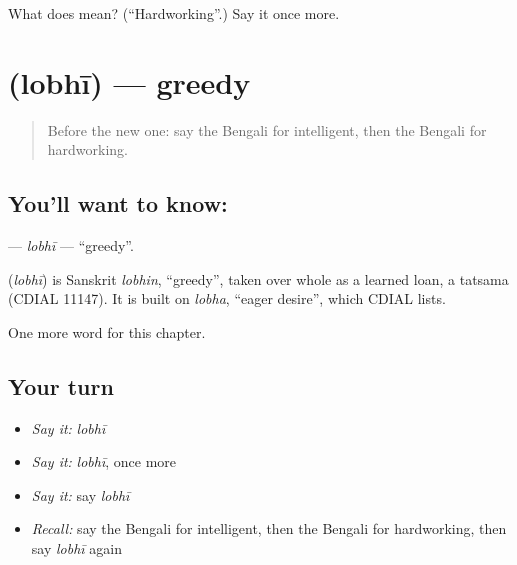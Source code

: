 \begin{tcolorbox}[breakable,colback=teal!4,colframe=teal!35!black,title={Before you move on}]
What does  mean? (\textquotedblleft{}Hardworking\textquotedblright{}.) Say it once more.
\end{tcolorbox}
\section[\texorpdfstring{\bn{লোভী} (lobhī)}{লোভী (lobhī)}]{ (lobhī) — greedy}

\label{lesson:BN-C160-lobhi}



\begin{quote}
Before the new one: say the Bengali for intelligent, then the Bengali for hardworking.
\end{quote}

\subsection*{You'll want to know: }
\textbf{} — \emph{lobhī} — \textquotedblleft{}greedy\textquotedblright{}.

\begin{cousinweb}
\textbf{} (\emph{lobhī}) is Sanskrit \emph{lobhin}, \textquotedblleft{}greedy\textquotedblright{}, taken over whole as a learned loan, a tatsama (CDIAL 11147). It is built on \emph{lobha}, \textquotedblleft{}eager desire\textquotedblright{}, which CDIAL lists.
\end{cousinweb}

\begin{grammarlens}[title={What you've built}]
One more word for this chapter.
\end{grammarlens}

\subsection*{Your turn}
\begin{itemize}
\raggedright
  \item \emph{Say it:} \emph{lobhī}
  \item \emph{Say it:} \emph{lobhī}, once more
  \item \emph{Say it:} say \emph{lobhī}
  \item \emph{Recall:} say the Bengali for intelligent, then the Bengali for hardworking, then say \emph{lobhī} again
\end{itemize}

